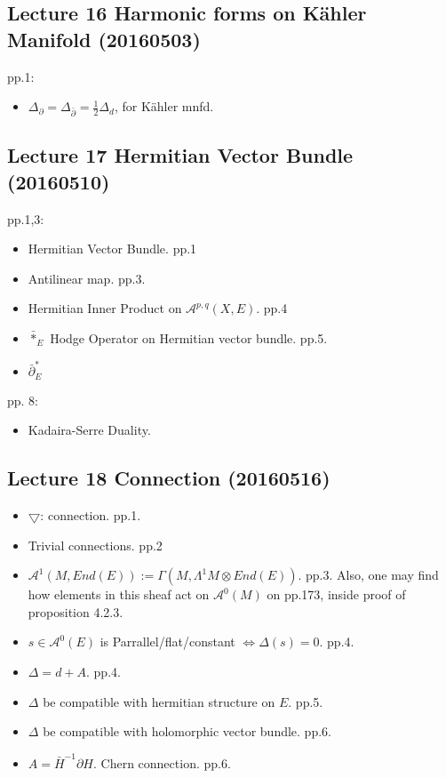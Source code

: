 \documentclass{article}
\numberwithin{equation}{subsection} %
\begin{document}
	\subsection{Lecture 16 Harmonic forms on K\"{a}hler Manifold (20160503)}
	
	pp.1:
	\begin{itemize}
		\item $\Delta_\partial = \Delta_{\bar{\partial}} = 
			\frac{1}{2}\Delta_d$, for K\"{a}hler mnfd.
	\end{itemize}
	
	\subsection{Lecture 17 Hermitian Vector Bundle (20160510)}
	pp.1,3:
	\begin{itemize}
		\item Hermitian Vector Bundle. pp.1
		\item Antilinear map. pp.3.
		\item Hermitian Inner Product on $\mathcal{A}^{p,q}(X,E)$. pp.4
		\item $\bar{*}_E$ Hodge Operator on Hermitian vector bundle. pp.5.
		\item $\bar{\partial}_E^*$
	\end{itemize}
	pp. 8:
	\begin{itemize}
		\item Kadaira-Serre Duality.
	\end{itemize}
	
	\subsection{Lecture 18 Connection (20160516)}
	\begin{itemize}
		\item $\bigtriangledown$: connection. pp.1.
		\item Trivial connections. pp.2
		\item $\mathcal{A}^1(M,End(E)):=\Gamma(M,\Lambda^1 M\otimes End(E))$. pp.3. Also, one may find how elements in this sheaf act on $\mathcal{A}^0(M)$ on pp.173, inside proof of proposition 4.2.3.
		\item $s\in \mathcal{A}^0(E)$ is Parrallel/flat/constant $\Leftrightarrow \Delta(s) = 0$. pp.4.
		\item $\Delta = d+A$. pp.4.
		\item $\Delta$ be compatible with hermitian structure on $E$. pp.5.
		\item $\Delta$ be compatible with holomorphic vector bundle. pp.6.
		\item $A=\bar{H}^{-1} \partial H$. Chern connection. pp.6.
	\end{itemize}
	
\end{document}
